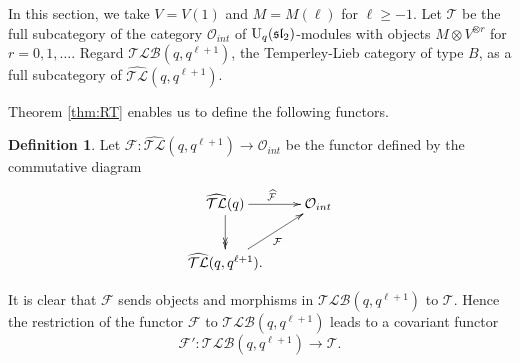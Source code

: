 \documentclass[12pt]{amsart}
\theoremstyle{definition}
\newtheorem{definition}[theorem]{Definition}
\theoremstyle{remark}
\numberwithin{equation}{section}
\newcommand{\CF}{{\mathcal F}}
\newcommand{\CO}{{\mathcal O}}
\newcommand{\CT}{{\mathcal T}}
\newcommand{\U}{{\rm{U}}}
\newcommand{\fsl}{{\mathfrak {sl}}}
\newcommand{\ATLC}{{\widehat{\mathcal{TL}}}}
\newcommand{\TLBC}{\mathcal{TLB}}
\begin{document}
In this section, we take $V=V(1)$ and $M=M(\ell)$ for $\ell\ge -1$.  
Let $\CT$ be the full subcategory of the category $\CO_{int}$ of $\U_q(\fsl_2)$-modules with objects 
$M\otimes V^{\otimes r}$ for $r=0, 1, \dots$. Regard $\TLBC(q, q^{\ell+1})$, the Temperley-Lieb 
category of type $B$, as a full subcategory of $\ATLC(q, q^{\ell+1})$.  



Theorem \ref{thm:RT} enables us to define the following functors. 
\begin{definition}
Let  $\CF: \ATLC(q,  q^{\ell+1})\longrightarrow \CO_{int}$ be the functor defined by the commutative diagram 
\[
\xymatrix{ 
\ATLC(q)  \ar@{->>}[d]\ar[r]^{\widehat\CF}& \CO_{int}\\
\ATLC(q, q^{\ell+1}).\ar[ur]_{\CF}&
}
\]



It is clear that $\CF$ sends objects and morphisms in $\TLBC(q, q^{\ell+1})$ to $\CT$.  Hence the 
restriction of the functor $\CF$ to $\TLBC(q, q^{\ell+1})$ leads  to a covariant functor 
\[
\CF':  \TLBC(q, q^{\ell+1})\longrightarrow \CT.
\]
\end{definition}
\end{document}

